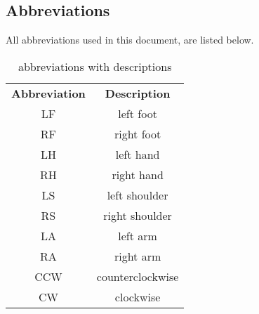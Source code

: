 \subsection{Abbreviations}
All abbreviations used in this document, are listed below.
\begin{table}[H]
\centering
\begin{tabular}{cc}
  \toprule
  \textbf{Abbreviation} & \textbf{Description}\\
  \cmidrule(lr){1-1}\cmidrule(lr){2-2}
  LF & left foot\\
  RF & right foot\\
  LH & left hand\\
  RH & right hand\\
  LS & left shoulder\\
  RS & right shoulder\\
  LA & left arm\\
  RA & right arm\\
  CCW & counterclockwise\\
  CW & clockwise\\
  \bottomrule
\end{tabular}
\label{abbreviations}
\caption{abbreviations with descriptions}
\end{table}
